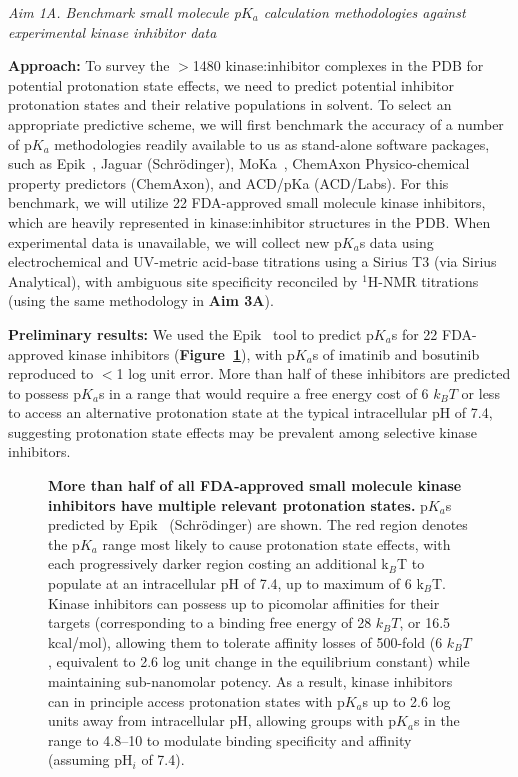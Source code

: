 \documentclass[11pt]{article}
\begin{document}
\emph{Aim 1A. Benchmark small molecule p$K_a$ calculation methodologies against experimental kinase inhibitor data}

{\bf Approach:} 
To survey the $>$1480 kinase:inhibitor complexes in the PDB for potential protonation state effects, we need to predict potential inhibitor protonation states and their relative populations in solvent.
To select an appropriate predictive scheme, we will first benchmark the accuracy of a number of p$K_a$ methodologies readily available to us as stand-alone software packages, such as Epik~\cite{uchiyama:jcamd:2007:epik}, Jaguar (Schr\"{o}dinger), MoKa~\cite{milletti:proteins:2009:moka}, ChemAxon Physico-chemical property predictors (ChemAxon), and ACD/pKa (ACD/Labs).
For this benchmark, we will utilize 22 FDA-approved small molecule kinase inhibitors, which are heavily represented in kinase:inhibitor structures in the PDB.
When experimental data is unavailable, we will collect new p$K_a$s data using electrochemical and UV-metric acid-base titrations using a Sirius T3 (via Sirius Analytical), with ambiguous site specificity reconciled by $^1$H-NMR titrations (using the same methodology in {\bf Aim 3A}).

{\bf Preliminary results:}
We used the Epik~\cite{uchiyama:jcamd:2007:epik} tool to predict p$K_a$s for 22 FDA-approved kinase inhibitors ({\bf Figure~\ref{figure:kinase-inhibitor-pKas}}), with p$K_a$s of imatinib and bosutinib reproduced to $<$1 log unit error.
More than half of these inhibitors are predicted to possess p$K_a$s in a range that would require a free energy cost of 6 $k_B T$ or less to access an alternative protonation state at the typical intracellular pH of 7.4, suggesting protonation state effects may be prevalent among selective kinase inhibitors.
\begin{figure}[h]
\vspace{-0.1in}
\centering
{}
\caption{\footnotesize {\bf More than half of all FDA-approved small molecule kinase inhibitors have multiple relevant protonation states.}
p$K_a$s predicted by Epik~\cite{uchiyama:jcamd:2007:epik} (Schr\"{o}dinger) are shown.
The red region denotes the p$K_a$ range most likely to cause protonation state effects, with each progressively darker region costing an additional k$_B$T to populate at an intracellular pH of 7.4, up to maximum of 6 k$_B$T.
Kinase inhibitors can possess up to picomolar affinities for their targets (corresponding to a binding free energy of 28 $k_B T$, or 16.5 kcal/mol), allowing them to tolerate affinity losses of 500-fold (6 $k_B T$, equivalent to 2.6 log unit change in the equilibrium constant) while maintaining sub-nanomolar potency.
As a result, kinase inhibitors can in principle access protonation states with p$K_a$s up to 2.6 log units away from intracellular pH, allowing groups with p$K_a$s in the range to 4.8--10 to modulate binding specificity and affinity (assuming pH$_i$ of 7.4).
\label{figure:kinase-inhibitor-pKas}} 
\vspace{-0.2in}
\end{figure}
\end{document}
